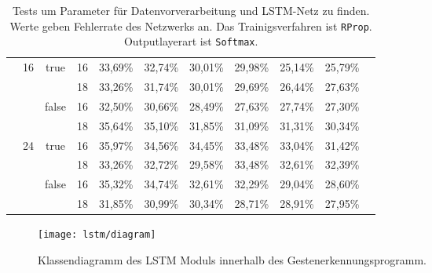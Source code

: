 \begin{sidewaystable}[h]
\begin{tabular}{|c|c|c|c|c|c|c|c|c|c|c|}
  &\multirow{4}{*}{16}&\multirow{2}{*}{true}&16&33,69\%&32,74\%&30,01\%&29,98\%&25,14\%&25,79\%&\\\cline{4-10}
  & & &18&33,26\%&31,74\%&30,01\%&29,69\%&26,44\%&27,63\%&\\\cline{3-10}
  & &\multirow{2}{*}{false}&16&32,50\%&30,66\%&28,49\%&27,63\%&27,74\%&27,30\%&\\\cline{4-10}
  & & &18&35,64\%&35,10\%&31,85\%&31,09\%&31,31\%&30,34\%&\\\cline{2-10}
  
  &\multirow{4}{*}{24}&\multirow{2}{*}{true}&16&35,97\%&34,56\%&34,45\%&33,48\%&33,04\%&31,42\%&\\\cline{4-10}
  & & &18&33,26\%&32,72\%&29,58\%&33,48\%&32,61\%&32,39\%&\\\cline{3-10}
  & &\multirow{2}{*}{false}&16&35,32\%&34,74\%&32,61\%&32,29\%&29,04\%&28,60\%&\\\cline{4-10}
  & & &18&31,85\%&30,99\%&30,34\%&28,71\%&28,91\%&27,95\%&\\
\hline
\end{tabular} 
\caption[Tests für Daten und LSTM-Netz]{Tests um Parameter für Datenvorverarbeitung und LSTM-Netz zu finden. Werte geben Fehlerrate des Netzwerks an. Das Trainigsverfahren ist \texttt{RProp}. Outputlayerart ist \texttt{Softmax}. }
\label{tab:inputtests}
\end{sidewaystable}

\begin{figure}[h]
  \begin{center}
  \texttt{[image: lstm/diagram]}
  \caption[\acs{LSTM} Klassendiagramm]{Klassendiagramm des \acs{LSTM} Moduls innerhalb des Gestenerkennungsprogramm. }
  \label{fig:lstm_class}
  \end{center}
\end{figure}  